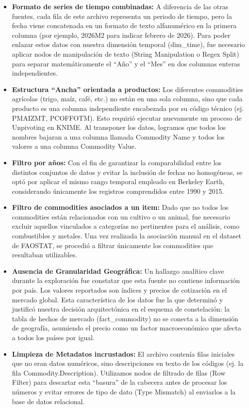 \begin{itemize}
	\item \textbf{Formato de series de tiempo combinadas:} A diferencia de las otras fuentes, cada fila de este archivo representa un periodo de tiempo, pero la fecha viene concatenada en un formato de texto alfanumérico en la primera columna (por ejemplo, 2026M2 para indicar febrero de 2026). Para poder enlazar estos datos con nuestra dimensión temporal (dim\_time), fue necesario aplicar nodos de manipulación de texto (String Manipulation o Regex Split) para separar matemáticamente el ``Año'' y el ``Mes'' en dos columnas enteras independientes. 
	
	\item \textbf{Estructura ``Ancha'' orientada a productos:} Los diferentes commodities agrícolas (trigo, maíz, café, etc.) no están en una sola columna, sino que cada producto es una columna independiente encabezada por su código técnico (ej. PMAIZMT, PCOFFOTM). Esto requirió ejecutar nuevamente un proceso de Unpivoting en KNIME. Al transponer los datos, logramos que todos los nombres bajaran a una columna llamada Commodity Name y todos los valores a una columna Commodity Value. 
	
	\item \textbf{Filtro por años:} Con el fin de garantizar la comparabilidad entre los distintos conjuntos de datos y evitar la inclusión de fechas no homogéneas, se optó por aplicar el mismo rango temporal empleado en Berkeley Earth, considerando únicamente los registros comprendidos entre 1990 y 2015.
	
	\item \textbf{Filtro de commodities asociados a un item:} Dado que no todos los commodities están relacionados con un cultivo o un animal, fue necesario excluir aquellos vinculados a categorías no pertinentes para el análisis, como combustibles y metales. Una vez realizada la asociación manual en el dataset de FAOSTAT, se procedió a filtrar únicamente los commodities que resultaban utilizables.
	
	\item \textbf{Ausencia de Granularidad Geográfica: }Un hallazgo analítico clave durante la exploración fue constatar que esta fuente no contiene información por país. Los valores reportados son índices y precios de cotización en el mercado global. Esta característica de los datos fue la que determinó y justificó nuestra decisión arquitectónica en el esquema de constelación: la tabla de hechos de mercado (fact\_commodity) no se conecta a la dimensión de geografía, asumiendo el precio como un factor macroeconómico que afecta a todos los países por igual. 
	
	\item \textbf{Limpieza de Metadatos incrustados: }El archivo contenía filas iniciales que no eran datos numéricos, sino descripciones en texto de los códigos (ej. la fila Commodity.Description). Utilizamos nodos de filtrado de filas (Row Filter) para descartar esta ``basura'' de la cabecera antes de procesar los números y evitar errores de tipo de dato (Type Mismatch) al enviarlos a la base de datos relacional. 
\end{itemize}
